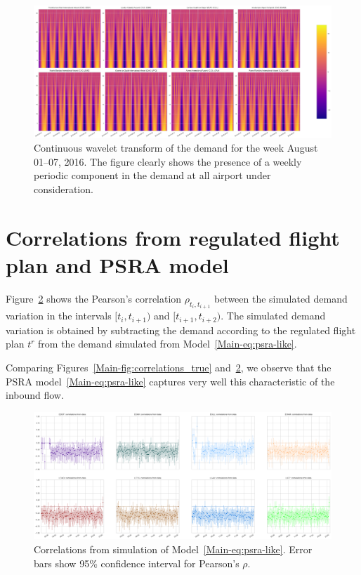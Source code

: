 \documentclass[]{elsarticle}
\begin{document}
\begin{figure}
  \includegraphics[width=\textwidth]{ContWavltTrasf}
  \caption{Continuous wavelet transform of the demand for the week August 01--07, 2016. The figure clearly shows the presence of a weekly periodic component in the demand at all airport under consideration.}\label{fig:cwt}
\end{figure}

\section{Correlations from regulated flight plan and \acs{PSRA} model}\label{sec:appb}

  Figure~\ref{fig:correlations_psra} shows the Pearson's correlation \(\rho_{t_i, t_{i+1}}\) between the simulated demand variation in the intervals \([t_i, t_{i+1})\) and \([t_{i+1}, t_{i+2})\). The simulated demand variation is obtained by subtracting the demand according to the regulated flight plan \(t^{r}\) from the demand simulated from Model~\eqref{Main-eq:psra-like}.

  Comparing Figures~\ref{Main-fig:correlations_true} and~\ref{fig:correlations_psra}, we observe that the \ac{PSRA} model~\eqref{Main-eq:psra-like} captures very well this characteristic of the inbound flow.

  \begin{figure}
      \includegraphics[width=\textwidth]{correlations_psra}
      \caption{Correlations from simulation of Model~\eqref{Main-eq:psra-like}. Error bars show 95\% confidence interval for Pearson's \(\rho\).}
      \label{fig:correlations_psra}
  \end{figure}
\end{document}
